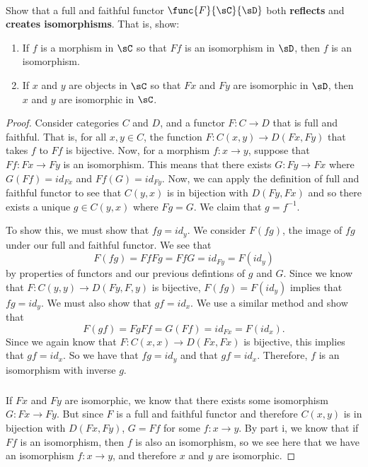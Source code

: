 \documentclass[main.tex]{subfiles}
\begin{document}
\paragraph{}
\begin{exercise}
	Show that a full and faithful functor \(\func{F}{\sC}{\sD}\) both
	\textbf{reflects} and \textbf{creates isomorphisms}. That is, show:
	\begin{enumerate}
		\item If \(f\) is a morphism in \(\sC\) so that \(Ff\) is an isomorphism
			in \(\sD\), then \(f\) is an isomorphism.

		\item If \(x\) and \(y\) are objects in \(\sC\) so that \(Fx\) and
			\(Fy\) are isomorphic in \(\sD\), then \(x\) and \(y\) are
			isomorphic in \(\sC\).
	\end{enumerate}
\end{exercise}
\begin{proof}
	Consider categories $C$ and $D$, and a functor $F: C \rightarrow D$ that is
	full and faithful. That is, for all $x,y \in C$, the function $F: C(x,y)
	\rightarrow D(Fx,Fy)$ that takes $f$ to $Ff$ is bijective. Now, for a
	morphism $f: x\rightarrow y$, suppose that $Ff: Fx \rightarrow Fy$ is an
	isomorphism. This means that there exists $G: Fy \rightarrow Fx$ where
	$G(Ff) = id_{Fx}$ and $Ff(G) = id_{Fy}$. Now, we can apply the definition of
	full and faithful functor to see that $C(y,x)$ is in bijection with
	$D(Fy,Fx)$ and so there exists a unique $g \in C(y,x)$ where $Fg = G$. We
	claim that $g = f^{-1}$.

	To show this, we must show that $fg = id_y$. We consider $F(fg)$, the image
	of $fg$ under our full and faithful functor. We see that
	$$ F(fg) = FfFg = FfG = id_{Fy} = F(id_y)$$
	by properties of functors and our previous defintions of $g$ and $G$. Since
	we know that $F: C(y,y) \rightarrow D(Fy,F,y)$ is bijective, $F(fg) =
	F(id_y)$ implies that $fg = id_y$. We must also show that $gf = id_x$. We
	use a similar method and show that
	$$F(gf) = FgFf = G(Ff) = id_{Fx} = F(id_x).$$
	Since we again know that $F: C(x,x) \rightarrow D(Fx,Fx)$ is bijective, this
	implies that $gf = id_x$. So we have that $fg = id_y$ and that $gf = id_x$.
	Therefore, $f$ is an isomorphism with inverse $g$.

	\subparagraph{}
	If $Fx$ and $Fy$ are isomorphic, we know that there exists
	some isomorphism $G: Fx \rightarrow Fy$. But since $F$ is a full and
	faithful functor and therefore $C(x,y)$ is in bijection with $D(Fx,Fy)$, $G
	= Ff$ for some $f: x \rightarrow y$. By part i, we know that if $Ff$ is an
	isomorphism, then $f$ is also an isomorphism, so we see here that we have an
	isomorphism $f: x \rightarrow y$, and therefore $x$ and $y$ are isomorphic.
\end{proof}
\end{document}

